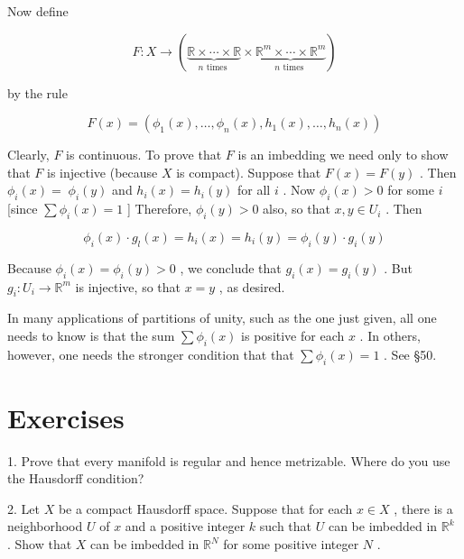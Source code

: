 \documentclass[10pt]{article}
\begin{document}
Now define

\[
F : X \rightarrow  \left( {\underset{n\text{ times }}{\underbrace{\mathbb{R} \times  \cdots  \times  \mathbb{R}}} \times  \underset{n\text{ times }}{\underbrace{{\mathbb{R}}^{m} \times  \cdots  \times  {\mathbb{R}}^{m}}}}\right)
\]

by the rule

\[
F\left( x\right)  = \left( {{\phi }_{1}\left( x\right) ,\ldots ,{\phi }_{n}\left( x\right) ,{h}_{1}\left( x\right) ,\ldots ,{h}_{n}\left( x\right) }\right)
\]

Clearly, \(F\) is continuous. To prove that \(F\) is an imbedding we need only to show that \(F\) is injective (because \(X\) is compact). Suppose that \(F\left( x\right)  = F\left( y\right)\) . Then \({\phi }_{i}\left( x\right)  = \; {\phi }_{i}\left( y\right)\) and \({h}_{i}\left( x\right)  = {h}_{i}\left( y\right)\) for all \(i\) . Now \({\phi }_{i}\left( x\right)  > 0\) for some \(i\) [since \(\sum {\phi }_{i}\left( x\right)  = 1\) ] Therefore, \({\phi }_{i}\left( y\right)  > 0\) also, so that \(x,y \in  {U}_{i}\) . Then

\[
{\phi }_{i}\left( x\right)  \cdot  {g}_{l}\left( x\right)  = {h}_{i}\left( x\right)  = {h}_{i}\left( y\right)  = {\phi }_{i}\left( y\right)  \cdot  {g}_{i}\left( y\right)
\]

Because \({\phi }_{i}\left( x\right)  = {\phi }_{i}\left( y\right)  > 0\) , we conclude that \({g}_{i}\left( x\right)  = {g}_{i}\left( y\right)\) . But \({g}_{i} : {U}_{i} \rightarrow  {\mathbb{R}}^{m}\) is injective, so that \(x = y\) , as desired.

In many applications of partitions of unity, such as the one just given, all one needs to know is that the sum \(\sum {\phi }_{i}\left( x\right)\) is positive for each \(x\) . In others, however, one needs the stronger condition that that \(\sum {\phi }_{i}\left( x\right)  = 1\) . See §50.

\section*{Exercises}

1. Prove that every manifold is regular and hence metrizable. Where do you use the Hausdorff condition?

2. Let \(X\) be a compact Hausdorff space. Suppose that for each \(x \in  X\) , there is a neighborhood \(U\) of \(x\) and a positive integer \(k\) such that \(U\) can be imbedded in \({\mathbb{R}}^{k}\) . Show that \(X\) can be imbedded in \({\mathbb{R}}^{N}\) for some positive integer \(N\) .
\end{document}
